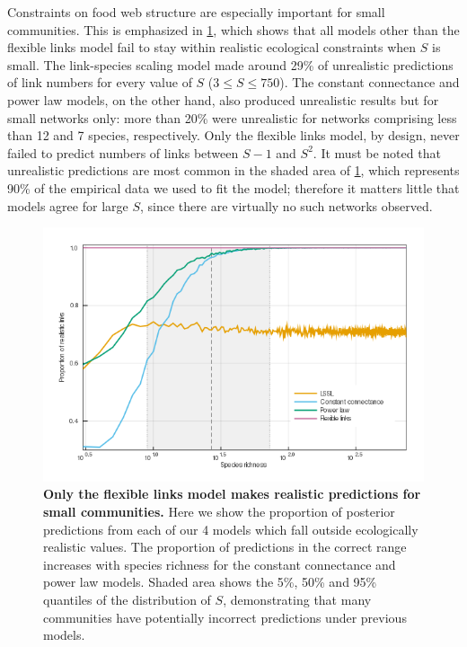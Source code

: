 \documentclass[12pt]{article}
\begin{document}
Constraints on food web structure are especially important for small
communities. This is emphasized in \cref{fig:real_predict}, which shows
that all models other than the flexible links model fail to stay within
realistic ecological constraints when \(S\) is small. The link-species
scaling model made around 29\% of unrealistic predictions of link
numbers for every value of \(S\) (\(3 \leq S \leq 750\)). The constant
connectance and power law models, on the other hand, also produced
unrealistic results but for small networks only: more than 20\% were
unrealistic for networks comprising less than 12 and 7 species,
respectively. Only the flexible links model, by design, never failed to
predict numbers of links between \(S-1\) and \(S^2\). It must be noted
that unrealistic predictions are most common in the shaded area of
\cref{fig:real_predict}, which represents 90\% of the empirical data we
used to fit the model; therefore it matters little that models agree for
large \(S\), since there are virtually no such networks observed.

\begin{figure}
\hypertarget{fig:real_predict}{%
\centering
\includegraphics{figures/real_predict.png}
\caption{\textbf{Only the flexible links model makes realistic
predictions for small communities.} Here we show the proportion of
posterior predictions from each of our 4 models which fall outside
ecologically realistic values. The proportion of predictions in the
correct range increases with species richness for the constant
connectance and power law models. Shaded area shows the 5\%, 50\% and
95\% quantiles of the distribution of \(S\), demonstrating that many
communities have potentially incorrect predictions under previous
models.}\label{fig:real_predict}
}
\end{figure}
\end{document}
